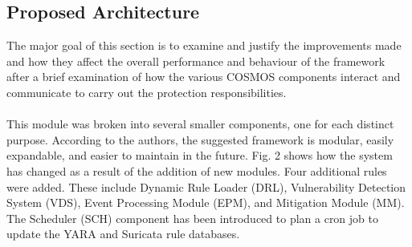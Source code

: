 \documentclass[12pt]{report}
\begin{document}
\subsection{Proposed Architecture}
The major goal of this section is to examine and justify the improvements made and how they affect the overall performance and behaviour of the framework after a brief examination of how the various COSMOS components interact and communicate to carry out the protection responsibilities.
\\ \\
This module was broken into several smaller components, one for each distinct purpose. According to the authors, the suggested framework is modular, easily expandable, and easier to maintain in the future. Fig. 2 shows how the system has changed as a result of the addition of new modules. Four additional rules were added. These include Dynamic Rule Loader (DRL), Vulnerability Detection System (VDS), Event Processing Module (EPM), and Mitigation Module (MM). The Scheduler (SCH) component has been introduced to plan a cron job to update the YARA and Suricata rule databases.
\end{document}
